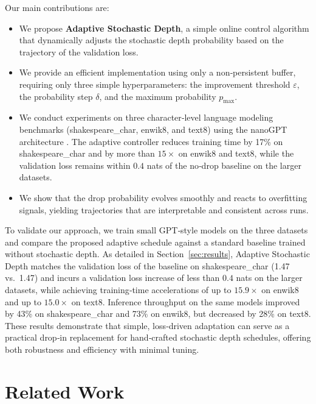 \documentclass{article} %
\begin{document}
Our main contributions are:

\begin{itemize}
    \item We propose \textbf{Adaptive Stochastic Depth}, a simple online control algorithm that dynamically adjusts the stochastic depth probability based on the trajectory of the validation loss.
    \item We provide an efficient implementation using only a non‑persistent buffer, requiring only three simple hyperparameters: the improvement threshold \(\varepsilon\), the probability step \(\delta\), and the maximum probability \(p_{\text{max}}\).
    \item We conduct experiments on three character‑level language modeling benchmarks (shakespeare\_char, enwik8, and text8) using the nanoGPT architecture \citep{karpathy2023nanogpt}. The adaptive controller reduces training time by 17\% on shakespeare\_char and by more than \(15\times\) on enwik8 and text8, while the validation loss remains within \(0.4\) nats of the no‑drop baseline on the larger datasets.
    \item We show that the drop probability evolves smoothly and reacts to overfitting signals, yielding trajectories that are interpretable and consistent across runs.
\end{itemize}

To validate our approach, we train small GPT‑style models on the three datasets and compare the proposed adaptive schedule against a standard baseline trained without stochastic depth.
As detailed in Section~\ref{sec:results}, Adaptive Stochastic Depth matches the validation loss of the baseline on shakespeare\_char (1.47 vs.\ 1.47) and incurs a validation loss increase of less than \(0.4\) nats on the larger datasets, while achieving training‑time accelerations of up to \(15.9\times\) on enwik8 and up to \(15.0\times\) on text8.
Inference throughput on the same models improved by 43\% on shakespeare\_char and 73\% on enwik8, but decreased by 28\% on text8.
These results demonstrate that simple, loss‑driven adaptation can serve as a practical drop‑in replacement for hand‑crafted stochastic depth schedules, offering both robustness and efficiency with minimal tuning.

\section{Related Work}
\label{sec:related}
\end{document}
